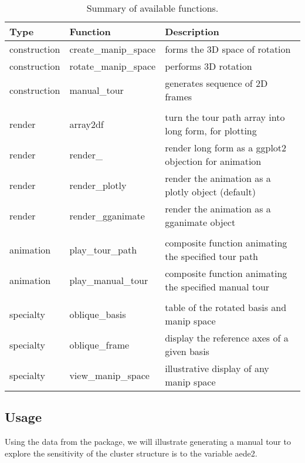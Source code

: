 \begin{Schunk}
\begin{table}

\caption{\label{tab:functionsTable}Summary of available functions.}
\centering
\begin{tabular}[t]{lll}
\toprule
Type & Function & Description\\
\midrule
construction & create\_manip\_space & forms the 3D space of rotation\\
construction & rotate\_manip\_space & performs 3D rotation\\
construction & manual\_tour & generates sequence of 2D frames\\
 &  & \\
render & array2df & turn the tour path array into long form, for plotting\\
render & render\_ & render long form as a ggplot2 objection for animation\\
render & render\_plotly & render the animation as a plotly object (default)\\
render & render\_gganimate & render the animation as a gganimate object\\
 &  & \\
animation & play\_tour\_path & composite function animating the specified tour path\\
animation & play\_manual\_tour & composite function animating the specified manual tour\\
 &  & \\
specialty & oblique\_basis & table of the rotated basis and manip space\\
specialty & oblique\_frame & display the reference axes of a given basis\\
specialty & view\_manip\_space & illustrative display of any manip space\\
\bottomrule
\end{tabular}
\end{table}

\end{Schunk}

\hypertarget{sec:usage}{%
\subsection{Usage}\label{sec:usage}}

Using the  data from the  package, we will
illustrate generating a manual tour to explore the sensitivity of the
cluster structure is to the variable aede2.

